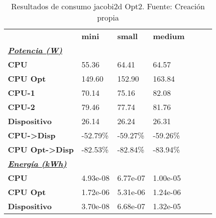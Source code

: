\begin{table}[H]
    \centering
    \begin{tabular}{lllllll}
    \rowcolor[HTML]{DAE8FC} \ & \textbf{mini} & \textbf{	small} & \textbf{	medium} \\
    \cellcolor[HTML]{DAE8FC} \textbf{\textbf{{\emph{{\underline{{Potencia (W)}}}}}}} &  & 	 & 	 \\
    \rowcolor[HTML]{EFEFEF} \cellcolor[HTML]{DAE8FC} \textbf{CPU} & 55.36 & 	64.41 & 	64.57 \\
    \cellcolor[HTML]{DAE8FC} \textbf{CPU Opt} & 149.60 & 	152.90 & 	163.84 \\
    \rowcolor[HTML]{EFEFEF} \cellcolor[HTML]{DAE8FC} \textbf{\quad CPU-1} & 70.14 & 	75.16 & 	82.08 \\
    \cellcolor[HTML]{DAE8FC} \textbf{\quad CPU-2} & 79.46 & 	77.74 & 	81.76 \\
    \rowcolor[HTML]{EFEFEF} \cellcolor[HTML]{DAE8FC} \textbf{Dispositivo} & 26.14 & 	26.24 & 	26.31 \\
    \cellcolor[HTML]{DAE8FC} \textbf{CPU->Disp} & -52.79\% & 	-59.27\% & 	-59.26\% \\
    \rowcolor[HTML]{EFEFEF} \cellcolor[HTML]{DAE8FC} \textbf{CPU Opt->Disp} & -82.53\% & 	-82.84\% & 	-83.94\% \\
    \cellcolor[HTML]{DAE8FC} \textbf{\textbf{{\emph{{\underline{{Energía (kWh)}}}}}}} &  & 	 & 	 \\
    \rowcolor[HTML]{EFEFEF} \cellcolor[HTML]{DAE8FC} \textbf{CPU} & 4.93e-08 & 	6.77e-07 & 	1.00e-05 \\
    \cellcolor[HTML]{DAE8FC} \textbf{CPU Opt} & 1.72e-06 & 	5.31e-06 & 	1.24e-06 \\
    \rowcolor[HTML]{EFEFEF} \cellcolor[HTML]{DAE8FC} \textbf{Dispositivo} & 3.70e-08 & 	6.68e-07 & 	1.32e-05 \\
    \end{tabular}
    \caption[Resultados de consumo jacobi2d Opt2]{{Resultados de consumo jacobi2d Opt2. Fuente: Creación propia}}
    \label{table_test_jacobi2d_Opt2_hw_powerResults}
\end{table}